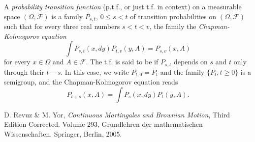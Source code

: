 \documentclass[12pt]{article}
\begin{document}
A \emph{probability transition function} (p.t.f., or just t.f. in context) on a measurable space $(\Omega, \mathcal{F})$ is a family $P_{s,t}$, $0 \leq s < t$ of transition probabilities on $(\Omega, \mathcal{F})$ such that for every three real numbers $s < t < v$, the family  the \emph{Chapman-Kolmogorov equation} 
\[\int P_{s,t}(x, dy)P_{t,v}(y, A) = P_{s,v}(x, A)\]
for every $x \in \Omega$ and $A \in \mathcal{F}$.  The t.f. is said to be   if $P_{s,t}$ depends on $s$ and $t$ only through their  $t-s$.  In this case, we write $P_{t,0} = P_t$ and the family $\{P_t, t \geq 0\}$ is a semigroup, and the Chapman-Kolmogorov equation reads 
\[P_{t+s}(x, A) = \int P_s(x, dy) P_t(y, A).\]

\begin{thebibliography}{1}
 D. Revuz \& M. Yor, \emph{Continuous Martingales and Brownian Motion}, Third Edition Corrected. Volume 293, Grundlehren der mathematischen Wissenschaften. Springer, Berlin, 2005.
\end{thebibliography}
\end{document}
